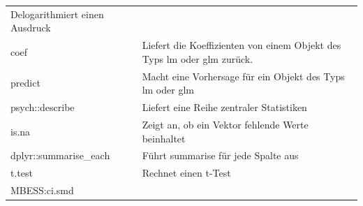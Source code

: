 \documentclass[12pt,ngerman,]{book}
\theoremstyle{definition}
\theoremstyle{definition}
\theoremstyle{remark}
\begin{document}
\begin{longtable}[]{@{}ll@{}}
\begin{minipage}[t]{0.42\columnwidth}
Delogarithmiert einen Ausdruck\strut
\end{minipage}\tabularnewline
\begin{minipage}[t]{0.31\columnwidth}\raggedright\strut
coef\strut
\end{minipage} & \begin{minipage}[t]{0.42\columnwidth}\raggedright\strut
Liefert die Koeffizienten von einem Objekt des Typs lm oder glm
zurück.\strut
\end{minipage}\tabularnewline
\begin{minipage}[t]{0.31\columnwidth}\raggedright\strut
predict\strut
\end{minipage} & \begin{minipage}[t]{0.42\columnwidth}\raggedright\strut
Macht eine Vorhersage für ein Objekt des Typs lm oder glm\strut
\end{minipage}\tabularnewline
\begin{minipage}[t]{0.31\columnwidth}\raggedright\strut
psych::describe\strut
\end{minipage} & \begin{minipage}[t]{0.42\columnwidth}\raggedright\strut
Liefert eine Reihe zentraler Statistiken\strut
\end{minipage}\tabularnewline
\begin{minipage}[t]{0.31\columnwidth}\raggedright\strut
is.na\strut
\end{minipage} & \begin{minipage}[t]{0.42\columnwidth}\raggedright\strut
Zeigt an, ob ein Vektor fehlende Werte beinhaltet\strut
\end{minipage}\tabularnewline
\begin{minipage}[t]{0.31\columnwidth}\raggedright\strut
dplyr::summarise\_each\strut
\end{minipage} & \begin{minipage}[t]{0.42\columnwidth}\raggedright\strut
Führt summarise für jede Spalte aus\strut
\end{minipage}\tabularnewline
\begin{minipage}[t]{0.31\columnwidth}\raggedright\strut
t.test\strut
\end{minipage} & \begin{minipage}[t]{0.42\columnwidth}\raggedright\strut
Rechnet einen t-Test\strut
\end{minipage}\tabularnewline
\begin{minipage}[t]{0.31\columnwidth}\raggedright\strut
MBESS:ci.smd\strut
\end{minipage} & \begin{minipage}[t]{0.42\columnwidth}\raggedright\strut

\end{minipage}
\end{longtable}
\end{document}

